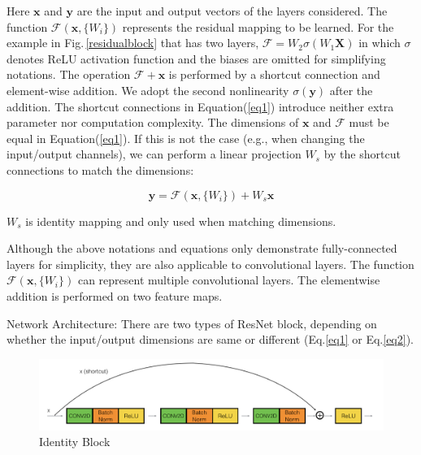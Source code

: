 Here $\mathbf{x}$ and $\mathbf{y}$ are the input and output vectors of the layers considered. The function $\mathcal{F} (\mathbf{x}, \{W_i\})$ represents the residual mapping to be learned. For the example in Fig.\,\ref{residualblock} that has two layers, $\mathcal{F}=W_2\sigma(W_1\mathbf{X})$ in which $\sigma$ denotes ReLU activation function and the biases are omitted for simplifying notations. The operation $\mathcal{F} + \mathbf{x}$ is performed by a shortcut connection and element-wise addition. We adopt the second nonlinearity $\sigma(\mathbf{y})$ after the addition. The shortcut connections in Equation(\ref{eq1}) introduce neither extra parameter nor computation complexity. The dimensions of $\mathbf{x}$ and $\mathcal{F}$ must be equal in Equation(\ref{eq1}). If this is not the case (e.g., when changing the input/output channels), we can perform a linear projection $W_s$ by the shortcut connections to match the dimensions: 

\begin{equation} \label{eq2}
\mathbf{y} = \mathcal{F} (\mathbf{x}, \{W_i\}) + W_s \mathbf{x}
\end{equation}

$W_s$ is identity mapping and only used when matching dimensions. 

Although the above notations and equations only demonstrate fully-connected layers for simplicity, they are also applicable to convolutional layers. The function $\mathcal{F} (\mathbf{x}, \{W_i\})$ can represent multiple convolutional layers. The elementwise addition is performed on two feature maps.

Network Architecture:
There are two types of ResNet block, depending on whether the input/output dimensions are same or different (Eq.\ref{eq1} or Eq.\ref{eq2}).

\begin{figure}[h]
	\centering
	\includegraphics[width=\textwidth]{Figs/identityblock.png}
    \caption{Identity Block}
    \label{identityblock}
\end{figure}

